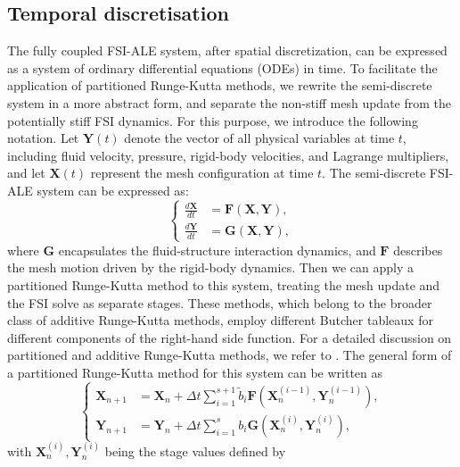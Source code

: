 \documentclass{article}
\begin{document}
\subsection{Temporal discretisation}
The fully coupled FSI-ALE system, after spatial discretization, can be expressed as a system of ordinary differential equations (ODEs) in time. To facilitate the application of partitioned Runge-Kutta methods, we rewrite the semi-discrete system in a more abstract form, and separate the non-stiff mesh update from the potentially stiff FSI dynamics. For this purpose, we introduce the following notation.
Let $\mathbf{Y}(t)$ denote the vector of all physical variables at time $t$, including fluid velocity, pressure, rigid-body velocities, and Lagrange multipliers, and let $\mathbf{X}(t)$ represent the mesh configuration at time $t$. The semi-discrete FSI-ALE system can be expressed as:
\begin{equation}
    \left\{
    \begin{aligned}
        \frac{d\mathbf{X}}{dt} &= \mathbf{F}(\mathbf{X}, \mathbf{Y}), \\
        \frac{d\mathbf{Y}}{dt} &= \mathbf{G}(\mathbf{X}, \mathbf{Y}),
    \end{aligned}
    \right.
\end{equation}
where $\mathbf{G}$ encapsulates the fluid-structure interaction dynamics, and $\mathbf{F}$ describes the mesh motion driven by the rigid-body dynamics. Then we can apply a partitioned Runge-Kutta method to this system, treating the mesh update and the FSI solve as separate stages. These methods, which belong to the broader class of additive Runge-Kutta methods, employ different Butcher tableaux for different components of the right-hand side function. For a detailed discussion on partitioned and additive Runge-Kutta methods, we refer to \cite{kennedy2003additive,ascher1997implicit}.
The general form of a partitioned Runge-Kutta method for this system can be written as
\begin{equation}
    \left\{
    \begin{aligned}
        \mathbf{X}_{n+1} &= \mathbf{X}_n + \Delta t \sum_{i=1}^{s+1} \tilde{b}_i \mathbf{F}(\mathbf{X}_n^{(i-1)}, \mathbf{Y}_n^{(i-1)}), \\
        \mathbf{Y}_{n+1} &= \mathbf{Y}_n + \Delta t \sum_{i=1}^s {b}_i \mathbf{G}(\mathbf{X}_n^{(i)}, \mathbf{Y}_n^{(i)}),
    \end{aligned}
    \right.
\end{equation}
with $\mathbf{X}_n^{(i)}, \mathbf{Y}_n^{(i)}$ being the stage values defined by
\end{document}
